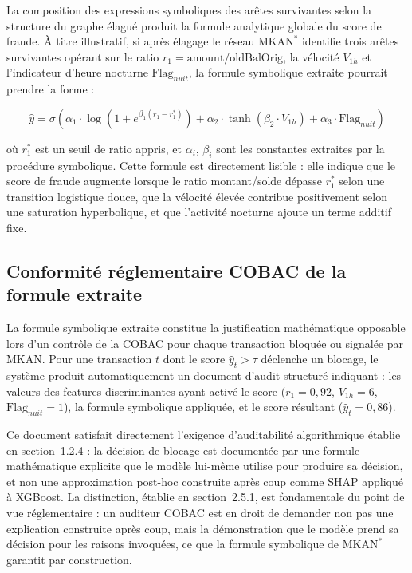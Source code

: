 \documentclass[11pt,a4paper,oneside]{report}
\theoremstyle{definition}
\theoremstyle{remark}
\begin{document}
La composition des expressions symboliques des arêtes survivantes selon la structure du graphe élagué produit la formule analytique globale du score de fraude. À titre illustratif, si après élagage le réseau $\text{MKAN}^*$ identifie trois arêtes survivantes opérant sur le ratio $r_1 = \text{amount}/\text{oldBalOrig}$, la vélocité $V_{1h}$ et l'indicateur d'heure nocturne $\text{Flag}_{nuit}$, la formule symbolique extraite pourrait prendre la forme :

\begin{equation}
\hat{y} = \sigma\left(\alpha_1 \cdot \log\!\left(1 + e^{\beta_1(r_1 - r_1^*)}\right) + \alpha_2 \cdot \tanh(\beta_2 \cdot V_{1h}) + \alpha_3 \cdot \text{Flag}_{nuit}\right)
\label{eq:formule-symbolique-illustrative}
\end{equation}

où $r_1^*$ est un seuil de ratio appris, et $\alpha_i$, $\beta_i$ sont les constantes extraites par la procédure symbolique. Cette formule est directement lisible : elle indique que le score de fraude augmente lorsque le ratio montant/solde dépasse $r_1^*$ selon une transition logistique douce, que la vélocité élevée contribue positivement selon une saturation hyperbolique, et que l'activité nocturne ajoute un terme additif fixe.

\subsection{Conformité réglementaire COBAC de la formule extraite}
\label{subsubsec:conformite-cobac}

La formule symbolique extraite constitue la justification mathématique opposable lors d'un contrôle de la COBAC pour chaque transaction bloquée ou signalée par MKAN. Pour une transaction $t$ dont le score $\hat{y}_t > \tau$ déclenche un blocage, le système produit automatiquement un document d'audit structuré indiquant : les valeurs des features discriminantes ayant activé le score ($r_1 = 0{,}92$, $V_{1h} = 6$, $\text{Flag}_{nuit} = 1$), la formule symbolique appliquée, et le score résultant ($\hat{y}_t = 0{,}86$).

Ce document satisfait directement l'exigence d'auditabilité algorithmique établie en section~1.2.4 : la décision de blocage est documentée par une formule mathématique explicite que le modèle lui-même utilise pour produire sa décision, et non une approximation post-hoc construite après coup comme SHAP appliqué à XGBoost. La distinction, établie en section~2.5.1, est fondamentale du point de vue réglementaire : un auditeur COBAC est en droit de demander non pas une explication construite après coup, mais la démonstration que le modèle prend sa décision pour les raisons invoquées, ce que la formule symbolique de $\text{MKAN}^*$ garantit par construction.
\end{document}
